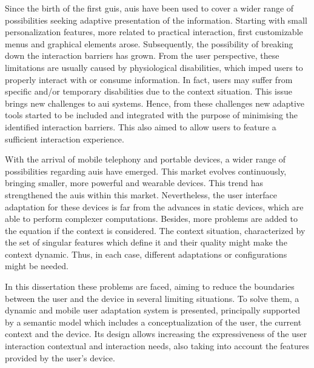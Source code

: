 




\begin{abstracts}        %
Since the birth of the first \acp{gui}, \acp{aui} have been used to cover
a wider range of possibilities seeking adaptive presentation of the information. 
Starting with small personalization features, more related to practical interaction, 
first customizable menus and graphical elements arose. Subsequently, the 
possibility of breaking down the interaction barriers has grown. From the user
perspective, these limitations are usually caused by physiological disabilities,
which imped users to properly interact with or consume information. In fact, 
users may suffer from specific and/or temporary disabilities due to the context 
situation. This issue brings new challenges to \ac{aui} systems. Hence, from 
these challenges new adaptive tools started to be included and integrated with 
the purpose of minimising the identified interaction barriers. This also aimed 
to allow users to feature a sufficient interaction experience.

With the arrival of mobile telephony and portable devices, a wider range of
possibilities regarding \acp{aui} have emerged. This market evolves continuously, 
bringing smaller, more powerful and wearable devices. This trend has strengthened 
the \acp{aui} within this market. Nevertheless, the user interface adaptation for 
these devices is far from the advances in static devices, which are able to perform 
complexer computations. Besides, more problems are added to the equation if the 
context is considered. The context situation, characterized by the set of singular 
features which define it and their quality might make the context dynamic. Thus, 
in each case, different adaptations or configurations might be needed. 

In this dissertation these problems are faced, aiming to reduce the boundaries
between the user and the device in several limiting situations. To solve them, 
a dynamic and mobile user adaptation system is presented, principally supported 
by a semantic model which includes a conceptualization of the user, the current
context and the device. Its design allows increasing the expressiveness of the 
user interaction contextual and interaction needs, also taking into account the 
features provided by the user's device.


\end{abstracts}

